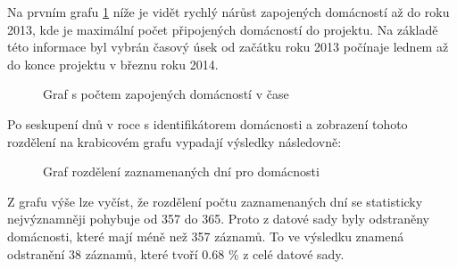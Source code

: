 \documentclass[FM,BP,fonts]{tulthesis}
\begin{document}
Na prvním grafu \ref{fig:domacnosti-v-case} níže je vidět rychlý nárůst zapojených domácností až do roku 2013, kde je maximální počet připojených domácností do projektu. Na základě této informace byl vybrán časový úsek od začátku roku 2013 počínaje lednem až do konce projektu v březnu roku 2014.


\begin{figure}[htbp]
	\centering
	\caption{Graf s počtem zapojených domácností v čase }
	\label{fig:domacnosti-v-case}
\end{figure}

Po seskupení dnů v roce s identifikátorem domácnosti a zobrazení tohoto rozdělení na krabicovém grafu vypadají výsledky následovně:

\begin{figure}[htbp]
	\centering
	\caption{Graf rozdělení zaznamenaných dní pro domácnosti }
	\label{fig:domacnosti-v-case-pocet-dni}
\end{figure}

Z grafu výše lze vyčíst, že rozdělení počtu zaznamenaných dní se statisticky nejvýznamněji pohybuje od 357 do 365. Proto z datové sady byly odstraněny domácnosti, které mají méně než 357 záznamů. To ve výsledku znamená odstranění 38 záznamů, které tvoří 0.68 \% z celé datové sady.
\end{document}
